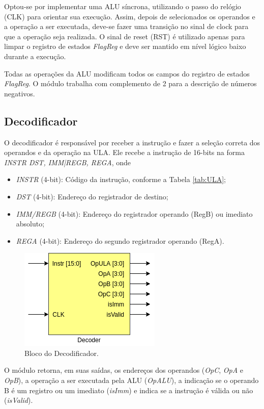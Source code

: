 \documentclass[11pt,a4paper,titlepage]{article}
\begin{document}
Optou-se por implementar uma ALU síncrona, utilizando o passo do relógio (CLK) para orientar sua execução. Assim, depois de selecionados os operandos e a operação a ser executada, deve-se fazer uma transição no sinal de clock para que a operação seja realizada. O sinal de reset (RST) é utilizado apenas para limpar o registro de estados \textit{FlagReg} e deve ser mantido em nível lógico baixo durante a execução.

Todas as operações da ALU modificam todos os campos do registro de estados \textit{FlagReg}. O módulo trabalha com complemento de 2 para a descrição de números negativos.

\subsection{Decodificador}\label{subsec:decode}

O decodificador é responsável por receber a instrução e fazer a seleção correta dos operandos e da operação na ULA. Ele recebe a instrução de 16-bits na forma \textit{INSTR DST, IMM|REGB, REGA}, onde

\begin{itemize}
\item \textit{INSTR} (4-bit): Código da instrução, conforme a Tabela \ref{tab:ULA};
\item \textit{DST} (4-bit): Endereço do registrador de destino;
\item \textit{IMM/REGB} (4-bit): Endereço do registrador operando (RegB) ou imediato absoluto;
\item \textit{REGA} (4-bit): Endereço do segundo registrador operando (RegA).
\end{itemize}

\begin{figure}[h]
\centering
\includegraphics[scale=0.5]{images/Decoder.png}
\caption{Bloco do Decodificador.}
\label{fig:blocodecoder}
\end{figure}

O módulo retorna, em suas saídas, os endereços dos operandos (\textit{OpC}, \textit{OpA} e \textit{OpB}), a operação a ser executada pela ALU (\textit{OpALU}), a indicação se o operando B é um registro ou um imediato (\textit{isImm}) e indica se a instrução é válida ou não (\textit{isValid}).
\end{document}

